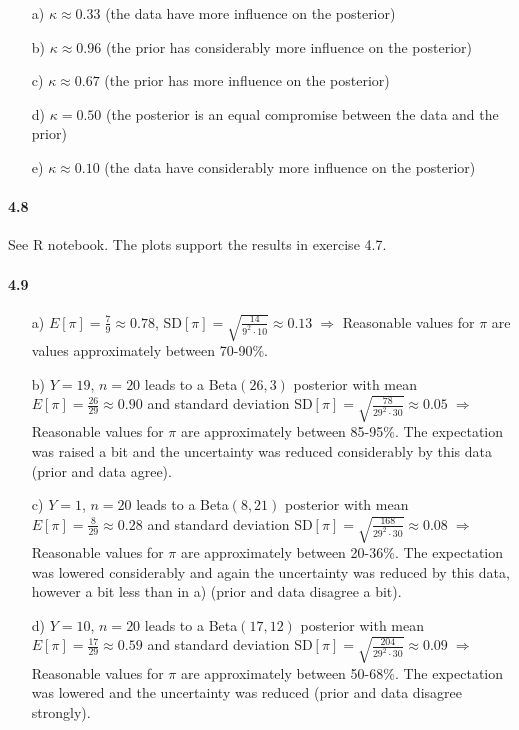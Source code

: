 \documentclass[fontsize=11pt,DIV=18,parskip=half]{scrartcl}
\begin{document}
\begin{enumerate}
\item[a)] $\kappa \approx 0.33$ (the data have more influence on the posterior)
\item[b)] $\kappa \approx 0.96$ (the prior has considerably more influence on the posterior)
\item[c)] $\kappa \approx 0.67$ (the prior has more influence on the posterior)
\item[d)] $\kappa = 0.50$ (the posterior is an equal compromise between the data and the prior)
\item[e)] $\kappa \approx 0.10$ (the data have considerably more influence on the posterior)
\end{enumerate}

\paragraph{4.8} See R notebook. The plots support the results in exercise 4.7.

\paragraph{4.9}
\begin{enumerate}
\item[a)] $E[\pi] = \frac79 \approx 0.78$, SD$[\pi] = \sqrt{\frac{14}{9^2 \cdot 10}} \approx 0.13 \; \Rightarrow$ Reasonable values for $\pi$ are values approximately between 70-90\%.
\item[b)] $Y=19$, $n=20$ leads to a Beta$(26,3)$ posterior with mean $E[\pi] = \frac{26}{29} \approx 0.90$ and standard deviation SD$[\pi] = \sqrt{\frac{78}{29^2 \cdot 30}} \approx 0.05 \; \Rightarrow$ Reasonable values for $\pi$ are approximately between 85-95\%. The expectation was raised a bit and the uncertainty was reduced considerably by this data (prior and data agree).
\item[c)] $Y=1$, $n=20$ leads to a Beta$(8,21)$ posterior with mean $E[\pi] = \frac{8}{29} \approx 0.28$ and standard deviation SD$[\pi] = \sqrt{\frac{168}{29^2 \cdot 30}} \approx 0.08 \; \Rightarrow$ Reasonable values for $\pi$ are approximately between 20-36\%. The expectation was lowered considerably and again the uncertainty was reduced by this data, however a bit less than in a) (prior and data disagree a bit).
\item[d)] $Y=10$, $n=20$ leads to a Beta$(17,12)$ posterior with mean $E[\pi] = \frac{17}{29} \approx 0.59$ and standard deviation SD$[\pi] = \sqrt{\frac{204}{29^2 \cdot 30}} \approx 0.09 \; \Rightarrow$ Reasonable values for $\pi$ are approximately between 50-68\%. The expectation was lowered and the uncertainty was reduced (prior and data disagree strongly).
\end{enumerate}
\end{document}
